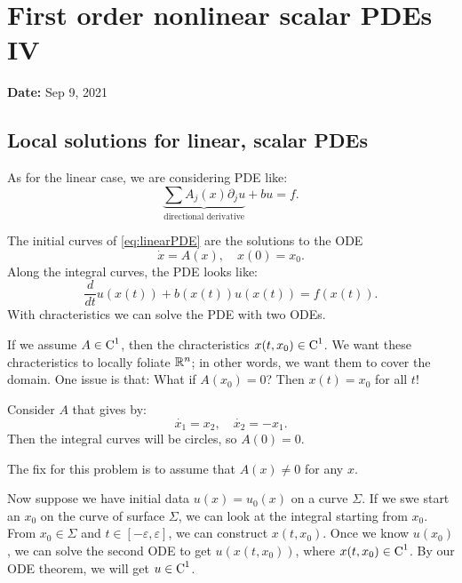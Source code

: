 \newpage 
\section{First order nonlinear scalar PDEs IV}

\textbf{Date:} Sep 9, 2021

\subsection{Local solutions for linear, scalar PDEs}
As for the linear case, we are considering PDE like: 
\begin{equation}
\label{eq:linearPDE}
    \underbrace{\sum A_j(x) \partial_j u}_{\text{directional derivative}} + bu = f.
\end{equation}

\begin{definition}
     The initial curves of \eqref{eq:linearPDE} are the solutions to the ODE 
    \[
        \dot{x} = A(x), \quad x(0) = x_0.
    \]
    Along the integral curves, the PDE looks like: 
    \[
        \frac{d}{dt}u(x(t))  + b(x(t))u(x(t)) = f(x(t)).
    \]
    With chracteristics we can solve the PDE with two ODEs.
\end{definition}

If we assume $A\in \operatorname{C}^1$, then the chracteristics $x(t,x_0)\in \operatorname{C}^1$. We want these chracteristics to locally foliate $\mathbb{R}^n$; in other words, we want them to cover the domain. One issue is that: What if $A(x_0) = 0$? Then $x(t)=x_0$ for all $t$!

\begin{example}
    Consider $A$ that gives by: 
    \[
        \dot{x_1} = x_2, \quad \dot{x_2} = -x_1.
    \]
    Then the integral curves will be circles, so $A(0) = 0$. 
\end{example}

The fix for this problem is to assume that $A(x)\neq 0$ for any $x$.

\begin{figure}[H]
\centering
{}
\end{figure}
Now suppose we have initial data $u(x) = u_0(x)$ on a curve $\Sigma$. If we swe start an $x_0$ on the curve of surface $\Sigma$, we can look at the integral starting from $x_0$. From $x_0\in \Sigma$ and $t\in [-\varepsilon, \varepsilon]$, we can construct $x(t,x_0)$. Once we know $u(x_0)$, we can solve the second ODE to get $u(x(t,x_0))$, where $x(t,x_0)\in \operatorname{C}^1$. By our ODE theorem, we will get $u\in \operatorname{C}^1$.

